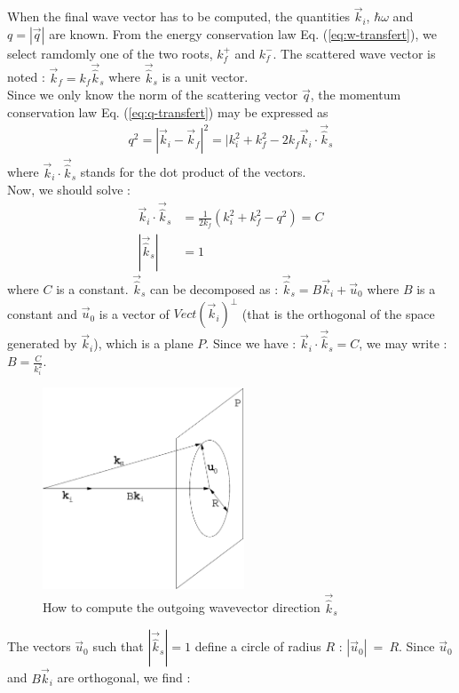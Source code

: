 When the final wave vector has to be computed, the quantities $\vec{k}_i$, $\hbar \omega$ and $q = |\vec{q}|$ are known.
From the energy conservation law Eq. (\ref{eq:w-transfert}), we select ramdomly one of the two roots, $k_f^+$ and $k_f^-$.
The scattered wave vector is noted : $\vec{k}_f = k_f \vec{\hat k}_s$ where $\vec{\hat k}_s$ is a unit vector.\\
Since we only know the norm of the scattering vector $\vec{q}$, the momentum conservation law Eq. (\ref{eq:q-transfert}) may be expressed as
\begin{align}
q^2 = |\vec{k}_i -\vec{k}_f|^2 = |k_i^2 + k_f^2 - 2 k_f \vec{k}_i \cdot \vec{\hat k}_s
\end{align}
where $\vec{k}_i \cdot \vec{\hat k}_s$ stands for the dot product of the vectors.\\
Now, we should solve :
\begin{align}
\vec{k}_i \cdot \vec{\hat k}_s &= \frac{1}{2k_f} (k_i^2 + k_f^2 - q^2) = C \\
|\vec{\hat k}_s| &= 1
\end{align}
where $C$ is a constant.
$\vec{\hat k}_s$ can be decomposed as : $\vec{\hat k}_s = B \vec{k}_i + \vec{u}_0$ where $B$ is a constant and $\vec{u}_0$ is a vector of $Vect(\vec{k}_i)^{\bot}$ (that is the orthogonal of the space generated by $\vec{k}_i$), which is a plane $P$.
Since we have : $\vec{k}_i \cdot \vec{\hat k}_s = C$, we may write : $B = \frac{C}{k_i^2}$.
\begin{figure}[!h]
\begin{center}
\includegraphics*[height=6cm]{figures/calckf_2.eps}
\caption{How to compute the outgoing wavevector direction $\vec{\hat k}_s$}
\label{fig:ann_kf}
\end{center}
\end{figure}
The vectors $\vec{u}_0$ such that $|\vec{\hat k}_s| = 1$ define a circle of radius $R$ : $|\vec{u}_0|~=~R$.
Since $\vec{u}_0$ and $B \vec{k}_i$ are orthogonal, we find :
